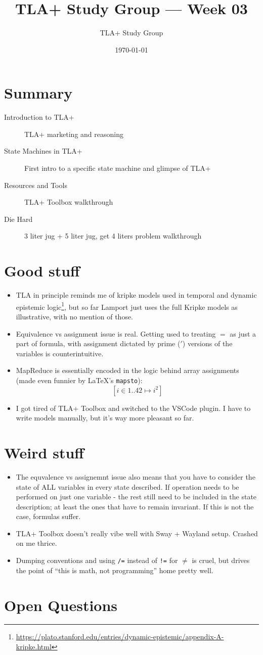 \documentclass[11pt]{article}
\title{TLA+ Study Group — Week 03}
\author{TLA+ Study Group}
\date{\today}
\begin{document}
\maketitle

\section*{Summary}
\begin{description}
    \item [Introduction to TLA+] TLA+ marketing and reasoning
    \item [State Machines in TLA+] First intro to a specific state machine and glimpse of TLA+
    \item [Resources and Tools] TLA+ Toolbox walkthrough
    \item [Die Hard] 3 liter jug + 5 liter jug, get 4 liters problem walkthrough
\end{description}

\section*{Good stuff}
\begin{itemize}
    \item TLA in principle reminds me of kripke models used in temporal and dynamic epistemic logic\footnote{\url{https://plato.stanford.edu/entries/dynamic-epistemic/appendix-A-kripke.html}},
    but so far Lamport just uses the full Kripke models as illustrative, with no mention of those.
    \item Equivalence vs assignment issue is real. Getting used to treating $=$ as just a part of formula, with assignment dictated by prime ($'$)
    versions of the variables is counterintuitive.
    \item MapReduce is essentially encoded in the logic behind array assignments (made even funnier by \LaTeX's \texttt{mapsto}): $$[i \in 1..42 \mapsto i^2]$$
    \item I got tired of TLA+ Toolbox and switched to the VSCode plugin. I have to write models manually, but it's way more pleasant so far.
\end{itemize}

\section*{Weird stuff}
\begin{itemize}
    \item The equvalence vs assignemnt issue also means that you have to consider the state of ALL variables in every state described. If
    operation needs to be performed on just one variable - the rest still need to be included in the state description; at least the ones
    that have to remain invariant. If this is not the case, formulas suffer.
    \item TLA+ Toolbox doesn't really vibe well with Sway + Wayland setup. Crashed on me thrice.
    \item Dumping conventions and using \texttt{/=} instead of \texttt{!=} for $\neq$ is cruel, but drives the point of ``this is math, not programming''
    home pretty well.
\end{itemize}



\section*{Open Questions}
\end{document}

